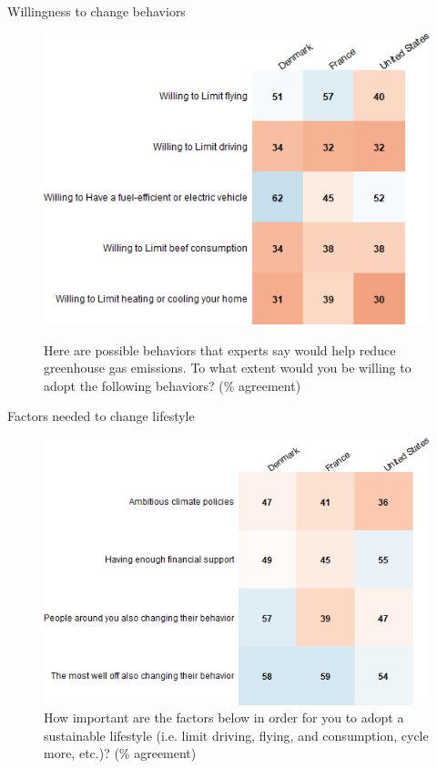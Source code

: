 \documentclass[aspectratio=169,9pt,dvipsnames]{beamer}
\begin{document}
\begin{frame}{Willingness to change behaviors}%
\begin{figure}[h!]
\centering
\caption{Here are possible behaviors that experts say would help reduce greenhouse gas emissions.
To what extent would you be willing to adopt the following behaviors? (\% agreement)}
\includegraphics[width=.6\textwidth]{../figures/country_comparison/willing_positive_countries.png} \\
\end{figure}
\end{frame}

\begin{frame}{Factors needed to change lifestyle}%
\begin{figure}[h!]
\centering
\caption{How important are the factors below in order for you to adopt a sustainable lifestyle (i.e. limit driving, flying, and consumption, cycle more, etc.)? (\% agreement)}
\includegraphics[width=.6\textwidth]{../figures/country_comparison/condition_positive_countries.png}
\end{figure}
\end{frame}

\end{document}
